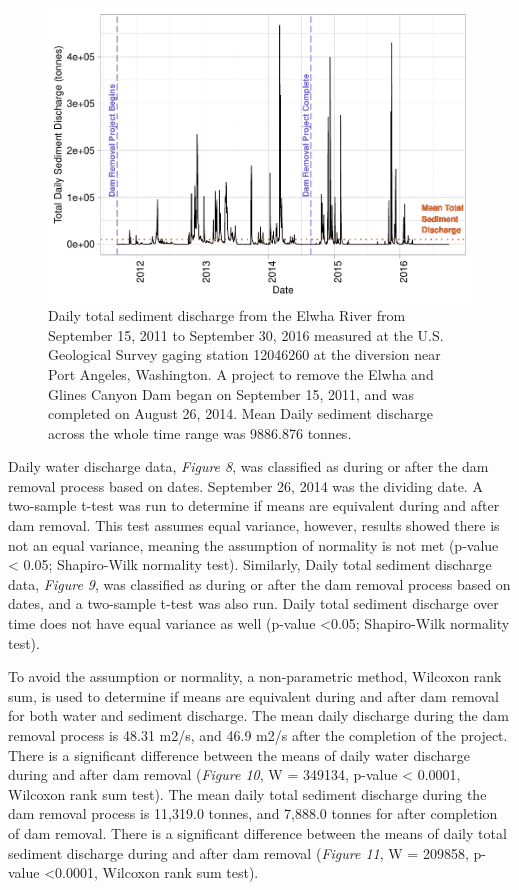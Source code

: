 \documentclass[12pt,]{article}
\begin{document}
\begin{figure}
\centering
\includegraphics{Mason_ENV872_ProjectFinal_files/figure-latex/Intro to Question (Figure 9)-1.pdf}
\caption{Daily total sediment discharge from the Elwha River from
September 15, 2011 to September 30, 2016 measured at the U.S. Geological
Survey gaging station 12046260 at the diversion near Port Angeles,
Washington. A project to remove the Elwha and Glines Canyon Dam began on
September 15, 2011, and was completed on August 26, 2014. Mean Daily
sediment discharge across the whole time range was 9886.876 tonnes.}
\end{figure}

Daily water discharge data, \emph{Figure 8}, was classified as during or
after the dam removal process based on dates. September 26, 2014 was the
dividing date. A two-sample t-test was run to determine if means are
equivalent during and after dam removal. This test assumes equal
variance, however, results showed there is not an equal variance,
meaning the assumption of normality is not met (p-value \textless{}
0.05; Shapiro-Wilk normality test). Similarly, Daily total sediment
discharge data, \emph{Figure 9}, was classified as during or after the
dam removal process based on dates, and a two-sample t-test was also
run. Daily total sediment discharge over time does not have equal
variance as well (p-value \textless{}0.05; Shapiro-Wilk normality test).

To avoid the assumption or normality, a non-parametric method, Wilcoxon
rank sum, is used to determine if means are equivalent during and after
dam removal for both water and sediment discharge. The mean daily
discharge during the dam removal process is 48.31 m2/s, and 46.9 m2/s
after the completion of the project. There is a significant difference
between the means of daily water discharge during and after dam removal
(\emph{Figure 10}, W = 349134, p-value \textless{} 0.0001, Wilcoxon rank
sum test). The mean daily total sediment discharge during the dam
removal process is 11,319.0 tonnes, and 7,888.0 tonnes for after
completion of dam removal. There is a significant difference between the
means of daily total sediment discharge during and after dam removal
(\emph{Figure 11}, W = 209858, p-value \textless{}0.0001, Wilcoxon rank
sum test).
\end{document}
